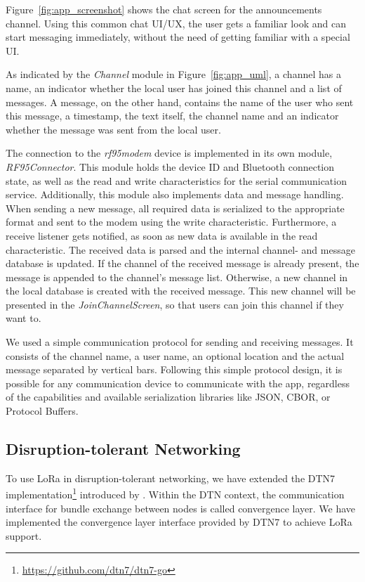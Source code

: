 Figure~\ref{fig:app_screenshot} shows the chat screen for the announcements channel.
Using this common chat UI/UX, the user gets a familiar look and can start messaging immediately, without the need of getting familiar with a special UI.

As indicated by the \emph{Channel} module in Figure~\ref{fig:app_uml}, a channel has a name, an indicator whether the local user has joined this channel and a list of messages.
A message, on the other hand, contains the name of the user who sent this message, a timestamp, the text itself, the channel name and an indicator whether the message was sent from the local user.

The connection to the \textit{rf95modem} device is implemented in its own module, \emph{RF95Connector}.
This module holds the device ID and Bluetooth connection state, as well as the read and write characteristics for the serial communication service.
Additionally, this module also implements data and message handling.
When sending a new message, all required data is serialized to the appropriate format and sent to the modem using the write characteristic.
Furthermore, a receive listener gets notified, as soon as new data is available in the read characteristic.
The received data is parsed and the internal channel- and message database is updated.
If the channel of the received message is already present, the message is appended to the channel's message list.
Otherwise, a new channel in the local database is created with the received message.
This new channel will be presented in the \emph{JoinChannelScreen}, so that users can join this channel if they want to.

We used a simple communication protocol for sending and receiving messages.
It consists of the channel name, a user name, an optional location and the actual message separated by vertical bars.
Following this simple protocol design, it is possible for any communication device to communicate with the app, regardless of the capabilities and available serialization libraries like JSON, CBOR, or Protocol Buffers.


\subsection{Disruption-tolerant Networking}
To use LoRa in disruption-tolerant networking, we have extended the DTN7 implementation\footnote{\url{https://github.com/dtn7/dtn7-go}} introduced by \cite{penning2019dtn7}.
Within the DTN context, the communication interface for bundle exchange between nodes is called convergence layer.
We have implemented the convergence layer interface provided by DTN7 to achieve LoRa support.

